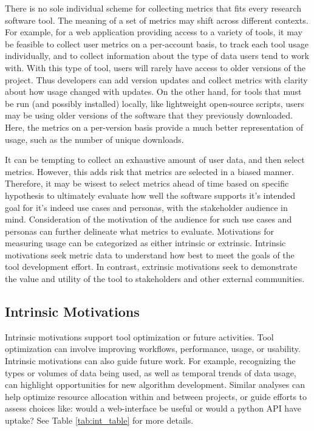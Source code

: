\documentclass{article}
\begin{document}
There is no sole individual scheme for collecting metrics that fits every research software tool.  The meaning of a set of metrics may shift across different contexts. For example, for a web application providing access to a variety of tools, it may be feasible to collect user metrics on a per-account basis, to track each tool usage individually, and to collect information about the type of data users tend to work with. With this type of tool, users will rarely have access to older versions of the project. Thus developers can add version updates and collect metrics with clarity about how usage changed with updates. On the other hand, for tools that must be run (and possibly installed)  locally, like lightweight open-source scripts, users may be using older versions of the software that they previously downloaded.  Here, the metrics on a per-version basis provide a much better representation of usage, such as the number of unique downloads. 

It can be tempting to collect an exhaustive amount of user data, and then select metrics. However, this adds risk that metrics are selected in a biased manner. Therefore, it may be wisest to select metrics ahead of time based on specific hypothesis to ultimately evaluate how well the software supports it’s intended goal for it’s indeed use cases and personas, with the stakeholder audience in mind. Consideration of the motivation of the audience for such use cases and personas can further delineate what metrics to evaluate. Motivations for measuring usage can be categorized as either intrinsic or extrinsic. Intrinsic motivations seek metric data to understand how best to meet the goals of the tool development effort. In contrast, extrinsic motivations seek to demonstrate the value and utility of the tool to stakeholders and other external communities. 

\subsection{Intrinsic Motivations}

Intrinsic motivations support tool optimization or future activities. Tool optimization can involve improving workflows, performance, usage, or usability. 
Intrinsic motivations can also guide future work. For example, recognizing the types or volumes of data being used, as well as temporal trends of data usage, can highlight opportunities for new algorithm development. Similar analyses can help optimize resource allocation within and between projects, or guide efforts to assess choices like: would a web-interface be useful or would a python API have uptake? See Table \ref{tab:int_table} for more details.
\end{document}
